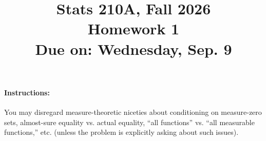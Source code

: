 \documentclass{article}
\theoremstyle{definition}
\begin{document}
\title{Stats 210A, Fall 2026\\
  Homework 1 \\
  {\large {\bf Due on}: Wednesday, Sep. 9}}
\date{}

\maketitle

\paragraph{Instructions:} You may disregard measure-theoretic niceties about conditioning on measure-zero sets, almost-sure equality vs. actual equality, ``all functions'' vs. ``all measurable functions,'' etc. (unless the problem is explicitly asking about such issues).
\end{document}
